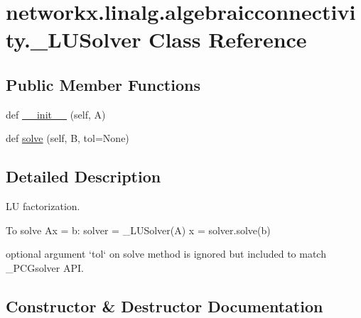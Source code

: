 \hypertarget{classnetworkx_1_1linalg_1_1algebraicconnectivity_1_1__LUSolver}{}\section{networkx.\+linalg.\+algebraicconnectivity.\+\_\+\+L\+U\+Solver Class Reference}
\label{classnetworkx_1_1linalg_1_1algebraicconnectivity_1_1__LUSolver}
\subsection*{Public Member Functions}
\begin{DoxyCompactItemize}
\item 
def \hyperlink{classnetworkx_1_1linalg_1_1algebraicconnectivity_1_1__LUSolver_ac6a8132026777dee0467ebaec4cf1400}{\+\_\+\+\_\+init\+\_\+\+\_\+} (self, A)
\item 
def \hyperlink{classnetworkx_1_1linalg_1_1algebraicconnectivity_1_1__LUSolver_add6ed953a6048e2883ff700b2ef71a84}{solve} (self, B, tol=None)
\end{DoxyCompactItemize}


\subsection{Detailed Description}
\begin{DoxyVerb}LU factorization.

To solve Ax = b:
    solver = _LUSolver(A)
    x = solver.solve(b)

optional argument `tol` on solve method is ignored but included
to match _PCGsolver API.
\end{DoxyVerb}
 

\subsection{Constructor \& Destructor Documentation}
\mbox{\label{classnetworkx_1_1linalg_1_1algebraicconnectivity_1_1__LUSolver_ac6a8132026777dee0467ebaec4cf1400}} 
